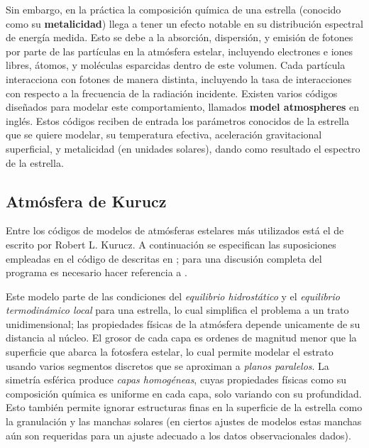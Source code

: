 Sin embargo, en la práctica la composición química de una estrella (conocido
como su \textbf{metalicidad}) llega a tener un efecto notable en su distribución
espectral de energía medida. Esto se debe a la absorción, dispersión, y emisión
de fotones por parte de las partículas en la atmósfera estelar, incluyendo
electrones e iones libres, átomos, y moléculas esparcidas dentro de este
volumen. Cada partícula interacciona con fotones de manera distinta, incluyendo
la tasa de interacciones con respecto a la frecuencia de la radiación incidente.
Existen varios códigos diseñados para modelar este comportamiento, llamados
\textbf{model atmospheres} en inglés. Estos códigos reciben de entrada los
parámetros conocidos de la estrella que se quiere modelar, su temperatura
efectiva, aceleración gravitacional superficial, y metalicidad (en unidades
solares), dando como resultado el espectro de la estrella.

\subsection{Atmósfera de Kurucz}

Entre los códigos de modelos de atmósferas estelares más utilizados está el de
 escrito por Robert L. Kurucz. A continuación se especifican las
suposiciones empleadas en el código de  descritas en
; para una discusión completa
del programa es necesario hacer referencia a \autocite{kurucz_atlas_1970}.

Este modelo parte de las condiciones del \textit{equilibrio hidrostático} y el
\textit{equilibrio termodinámico local} para una estrella, lo cual simplifica el
problema a un trato unidimensional; las propiedades físicas de la atmósfera
depende unicamente de su distancia al núcleo. El grosor de cada capa es ordenes
de magnitud menor que la superficie que abarca la fotosfera estelar, lo cual
permite modelar el estrato usando varios segmentos discretos que se aproximan a
\textit{planos paralelos}. La simetría esférica produce \textit{capas
homogéneas}, cuyas propiedades físicas como su composición química es uniforme
en cada capa, solo variando con su profundidad. Esto también permite ignorar
estructuras finas en la superficie de la estrella como la granulación y las
manchas solares (en ciertos ajustes de modelos estas manchas aún son requeridas
para un ajuste adecuado a los datos observacionales dados). %

